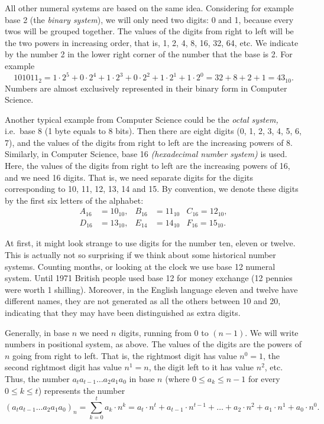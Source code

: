 All other numeral systems are based on the same idea. 
Considering for example base 2 (the \emph{binary system}), 
we will only need two digits: 0 and 1, 
because every twos will be grouped together. 
The values of the digits from right to left will be the two powers in increasing order, 
that is, 1, 2, 4, 8, 16, 32, 64, etc. 
We indicate by the number 2 in the lower right corner of the number that the base is 2. 
For example 
\[
101011_{2} = 1 \cdot 2^5 + 0 \cdot 2^4 + 1 \cdot 2^3 + 0 \cdot 2^2 + 1 \cdot 2^1 + 1 \cdot 2^0 = 32 + 8 + 2 + 1 = 43_{10}.
\]
Numbers are almost exclusively represented in their binary form in Computer Science. 

Another typical example from Computer Science could be the \emph{octal system,} 
i.e.\ base 8 (1 byte equals to 8 bits). 
Then there are eight digits (0, 1, 2, 3, 4, 5, 6, 7), 
and the values of the digits from right to left are the increasing powers of 8. 
Similarly, in Computer Science, base 16 \emph{(hexadecimal number system)} is used. 
Here, the values of the digits from right to left are the increasing powers of 16, 
and we need 16 digits. 
That is, we need separate digits for the digits corresponding to 10, 11, 12, 13, 14 and 15. 
By convention, we denote these digits by the first six letters of the alphabet: 
\begin{align*}
A_{16} &= 10_{10}, & B_{16} &= 11_{10} & C_{16} = 12_{10}, \\
D_{16} &= 13_{10}, & E_{14} &= 14_{10} & F_{16} = 15_{10}. 
\end{align*}

At first, it might look strange to use digits for the number ten, eleven or twelve. 
This is actually not so surprising if we think about some historical number systems. 
Counting months, or looking at the clock we use base 12 numeral system. 
Until 1971 British people used base 12 for money exchange (12 pennies were worth 1 shilling). 
Moreover, 
in the English language eleven and twelve have different names, 
they are not generated as all the others between 10 and 20, 
indicating that they may have been distinguished as extra digits. 

Generally, 
in base $n$ we need $n$ digits, running from 0 to $(n-1)$. 
We will write numbers in positional system, as above. 
The values of the digits are the powers of $n$ going from right to left. 
That is, the rightmost digit has value $n^0 = 1$, 
the second rightmost digit has value $n^1 = n$, 
the digit left to it has value $n^2$, etc. 
Thus, the number $a_ta_{t-1} \dots a_2a_1a_0$ in base $n$ 
(where $0\leq a_k \leq n-1$ for every $0\leq k\leq t$) 
represents the number
\[
(a_ta_{t-1} \dots a_2a_1a_0)_{n} = \sum_{k=0}^t a_k \cdot n^k = a_t \cdot n^t + a_{t-1} \cdot n^{t-1} + \dots + a_2 \cdot n^2 + a_1 \cdot n^1 + a_0 \cdot n^0. 
\]

